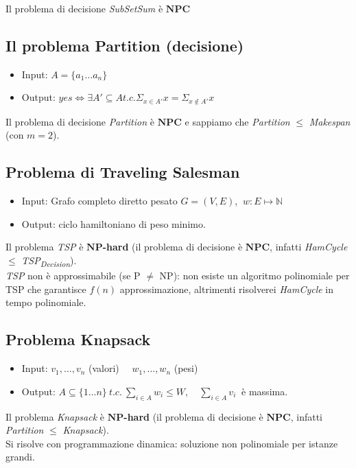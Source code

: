 \documentclass[a4paper]{article}
\theoremstyle{definition}
\newcommand{\N}{\mathbb{N}}
\newcommand{\np}{\mathbf{NP}}
\newcommand{\npc}{\mathbf{NPC}}
\begin{document}
		\noindent
		Il problema di decisione \textit{SubSetSum} è $\npc$
		
		\subsection{Il problema Partition (decisione)}
		\begin{itemize}
			\item Input: $A = \{ a_1 \dots a_n \}$
			\item Output: $yes \Leftrightarrow \exists A' \subseteq A t.c. \Sigma_{x\in A'} x = \Sigma_{x\notin A'} x$
		\end{itemize}
	
	\noindent
	Il problema di decisione \textit{Partition} è $\npc$ e sappiamo che \textit{Partition} $\leq$ \textit{Makespan} (con $m=2$).
		
		\subsection{Problema di Traveling Salesman}
			\begin{itemize}
				\item Input: Grafo completo diretto pesato $ G = (V, E) $, $ \ w : E \mapsto \N $
				\item Output: ciclo hamiltoniano di peso minimo.
			\end{itemize}
		
		\noindent
		Il problema \textit{TSP} è $\np$\textbf{-hard} (il problema di decisione è $\npc$, infatti \textit{HamCycle} $\leq$ \textit{TSP\textsubscript{Decision}}).\\
		\textit{TSP} non è approssimabile (se P $\neq$ NP): non esiste un algoritmo polinomiale per TSP che garantisce $f(n)$ approssimazione, altrimenti risolverei \textit{HamCycle} in tempo polinomiale.
		
		\subsection{Problema Knapsack}
			\begin{itemize}
				\item Input: $ v_1, \dots, v_n $ (valori) $ \quad w_1, \dots, w_n $ (pesi)
				\item Output: $ A \subseteq \{1\dots n \} \ t.c.\ \sum\limits_{i \in A} w_i \leq W,\quad \sum\limits_{i \in A} v_i \ $ è massima.
			\end{itemize}
		
		\noindent
		Il problema \textit{Knapsack} è $\np$\textbf{-hard} (il problema di decisione è $\npc$, infatti \textit{Partition} $\leq$ \textit{Knapsack}).\\
		Si risolve con programmazione dinamica: soluzione non polinomiale per istanze grandi. 
		
\end{document}
